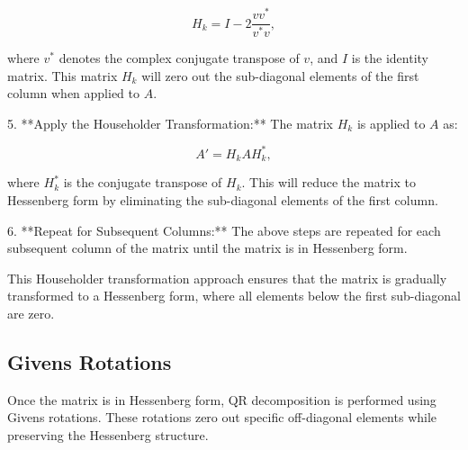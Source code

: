 \documentclass[12pt]{article}
\begin{document}
   \[
   H_k = I - 2 \frac{v v^*}{v^* v},
   \]

   where \( v^* \) denotes the complex conjugate transpose of \( v \), and \( I \) is the identity matrix. This matrix \( H_k \) will zero out the sub-diagonal elements of the first column when applied to \( A \).

5. **Apply the Householder Transformation:**
   The matrix \( H_k \) is applied to \( A \) as:

   \[
   A' = H_k A H_k^*,
   \]

   where \( H_k^* \) is the conjugate transpose of \( H_k \). This will reduce the matrix to Hessenberg form by eliminating the sub-diagonal elements of the first column.

6. **Repeat for Subsequent Columns:**
   The above steps are repeated for each subsequent column of the matrix until the matrix is in Hessenberg form.

This Householder transformation approach ensures that the matrix is gradually transformed to a Hessenberg form, where all elements below the first sub-diagonal are zero.

\subsection{Givens Rotations}
Once the matrix is in Hessenberg form, QR decomposition is performed using Givens rotations. These rotations zero out specific off-diagonal elements while preserving the Hessenberg structure.
\end{document}
